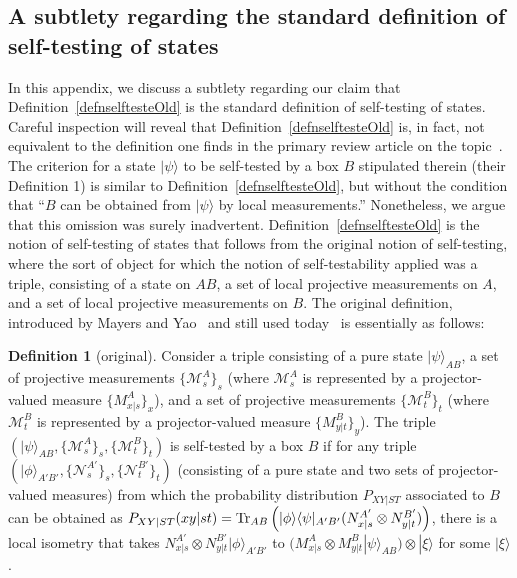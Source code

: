 \documentclass[12pt]{article}
\theoremstyle{plain}
\theoremstyle{definition}
\newtheorem{defn}{Definition}
\begin{document}
\begin{appendices}
\section{A subtlety regarding the standard definition of self-testing of states}\label{Oversight}

In this appendix, we discuss a subtlety regarding our claim that Definition~\ref{defnselftesteOld} is the standard definition of self-testing of states.  
Careful inspection will reveal that Definition~\ref{defnselftesteOld} is, in fact, not equivalent to the definition one finds in the primary review article on the topic~\cite{vsupic2020self}.  The criterion for a state $|\psi\rangle$ to be self-tested by a box $B$ stipulated therein  (their Definition 1) is similar to Definition~\ref{defnselftesteOld},
  but without the condition that \enquote{$B$ can be obtained from $|\psi\rangle$ by local measurements.} Nonetheless, we argue that this omission 
 was surely inadvertent.  Definition~\ref{defnselftesteOld} is the notion of self-testing of states that follows from the original notion of self-testing, where the sort of object for which the notion of self-testability applied was a triple, consisting of a state on $AB$, a set of local projective measurements on $A$, and a set of local projective measurements on $B$.  
 The original definition, introduced by Mayers and Yao~\cite{mayers1998quantum,mayers2003self} and still used today~\cite{Yang2013selftesting,Wang2016,Bancal2015SelfTesting,Supi2018Mutliselftest} is essentially as follows:

\begin{defn}[original]
\label{defnselftesteOriginal}
Consider a triple  consisting of a pure state $|\psi\rangle_{AB}$, a set of projective measurements $\{ \mathcal{M}^A_s\}_s$ (where $\mathcal{M}^A_s$ is represented by a projector-valued measure $\{M^{A}_{x|s}\}_x$), and a set of projective measurements $\{ \mathcal{M}^B_t\}_t$ (where $\mathcal{M}^B_t$ is represented by a projector-valued measure $\{M^{B}_{y|t}\}_y$). 
 The triple $(|\psi\rangle_{AB}, \{ \mathcal{M}^A_s\}_s, \{\mathcal{M}^B_t\}_t)$ is self-tested by a  box $B$  if for any triple $(|\phi\rangle_{A'B'}, \{ \mathcal{N}^{A'}_s\}_s, \{ \mathcal{N}^{B'}_t\}_t)$ (consisting of a pure state and two sets of projector-valued measures) from which the probability distribution $P_{XY|ST}$ associated to $B$ can be obtained as $P_{XY|ST}(xy|st)= {\rm Tr}_{AB}\left(|\phi\rangle \langle \psi|_{A'B'} (N^{A'}_{x|s} \otimes N^{B'}_{y|t}) \right)$, there is a local isometry  that takes $N^{A'}_{x|s} \otimes N^{B'}_{y|t}|\phi\rangle_{A'B'}$ to $\big( M^{A}_{x|s} \otimes M^{B}_{y|t}|\psi\rangle_{AB} \big) \otimes |\xi\rangle$ for some $|\xi\rangle$.
 \end{defn}
 


\end{appendices}
\end{document}

